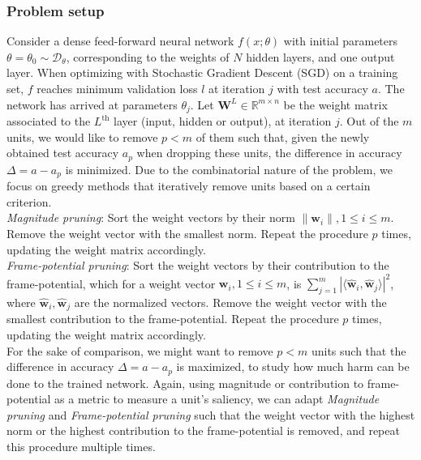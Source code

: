 \subsubsection*{Problem setup}
Consider a dense feed-forward neural network $f(x; \theta)$ with initial parameters $\theta = \theta_0 \sim \mathcal{D}_{\theta}$, corresponding to the weights of $N$ hidden layers, and one output layer. When optimizing with Stochastic Gradient Descent (SGD) on a training set, $f$ reaches minimum validation loss $l$ at iteration $j$ with test accuracy $a$. The network has arrived at parameters $\theta_j$. Let $\mathbf{W}^L \in \mathbb{R}^{m \times n}$ be the weight matrix associated to the $L^{\text{th}}$ layer (input, hidden or output), at iteration $j$. Out of the $m$ units, we would like to remove $p < m$ of them such that, given the newly obtained test accuracy $a_p$ when dropping these units, the difference in accuracy $\Delta = a - a_p$ is minimized. Due to the combinatorial nature of the problem, we focus on greedy methods that iteratively remove units based on a certain criterion.  \\

\textit{Magnitude pruning}: Sort the weight vectors by their norm $\|\mathbf{w}_i\|, 1 \leq i \leq m$. Remove the weight vector with the smallest norm. Repeat the procedure $p$ times, updating the weight matrix accordingly. \\

\textit{Frame-potential pruning}: Sort the weight vectors by their contribution to the frame-potential, which for a weight vector $\mathbf{w}_i, 1 \leq i \leq m$, is $\sum\limits_{j=1}^m | \langle \hat{\mathbf{w}}_i, \hat{\mathbf{w}}_j \rangle |^2$, where $\hat{\mathbf{w}}_i, \hat{\mathbf{w}}_j$ are the normalized vectors. Remove the weight vector with the smallest contribution to the frame-potential. Repeat the procedure $p$ times, updating the weight matrix accordingly. \\

For the sake of comparison, we might want to remove $p < m$ units such that the difference in accuracy $\Delta = a - a_p$ is maximized, to study how much harm can be done to the trained network. Again, using magnitude or contribution to frame-potential as a metric to measure a unit's saliency, we can adapt \textit{Magnitude pruning} and \textit{Frame-potential pruning} such that the weight vector with the highest norm or the highest contribution to the frame-potential is removed, and repeat this procedure multiple times. \\

